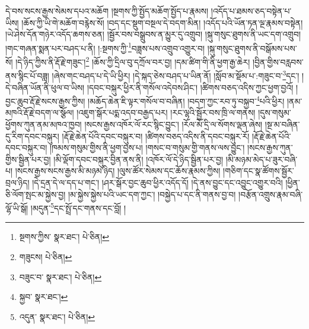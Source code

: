 དེ་བས་སངས་རྒྱས་སེམས་དཔའ་མཆོག །སྔགས་ཀྱི་སྤྱོད་མཆོག་སྤྱོད་པ་རྣམས། །འདོད་པ་ཐམས་ཅད་བསྟེན་པ་ཡིས། །ཆོས་ཀྱི་ཡི་གེ་མཆོག་བརྙེས་སོ། །བད་དང་སྡུག་བསྔལ་དེ་བདག་མིན། །འདོད་པའི་ཡོན་ཏན་ལྔ་རྣམས་བསྟེན། །ཡེ་ཤེས་དོན་གཉེར་འདོད་ཆགས་ཅན། །སྦྱོར་བས་བསྒྲུབས་ན་མྱུར་དུ་འགྲུབ། །སྐུ་གསུང་ཐུགས་ནི་ཡང་དག་འགྲུབ། །གང་གཞན་སྨན་པར་བཤད་པ་ནི། །:སྔགས་ཀྱི་\footnote{སྔགས་ཀྱིས་  སྣར་ཐང་།  པེ་ཅིན། }བཟླས་པས་འགྲུབ་འགྱུར་བ། །སྐུ་གསུང་ཐུགས་ནི་བསྒོམས་པས་སོ། །དེ་ཉིད་ཀྱིས་ནི་རྡོ་རྗེ་གཟུང་།\footnote{གཟུངས།  པེ་ཅིན། } །ཆོས་ཀྱི་དྲིལ་བུ་དཀྲོལ་བར་བྱ། །དམ་ཚིག་གི་ནི་ཕྱག་རྒྱ་ཆེར། །བྱིན་གྱིས་བརླབས་ནས་སྙིང་པོ་བཟླ། །ཞེས་གང་བཤད་པ་དེ་ཡི་ཕྱིར། །དེ་སྐད་ཅེས་བཤད་པ་ཡིན་ནོ། །སློབ་མ་སྡོམ་པ་:གཟུང་བ་\footnote{བཟུང་བ་  སྣར་ཐང་།  པེ་ཅིན། }དང་། །དེ་བཞིན་ཡོན་ནི་ཕུལ་བ་ཡིས། །དབང་བསྐུར་ཕྱིར་ནི་གསོལ་འདེབས་ཤིང་། །ཚིགས་བཅད་འདིས་ཀྱང་ཕྱག་བྱའོ། །བྱང་ཆུབ་རྡོ་རྗེ་སངས་རྒྱས་ཀྱིས། །མཆོད་ཆེན་ཇི་ལྟར་གསོལ་བ་བཞིན། །བདག་ཀྱང་རབ་ཏུ་བསྐྱབ་\footnote{སྐྱབ་  སྣར་ཐང་། }པའི་ཕྱིར། །ནམ་མཁའི་རྡོ་རྗེ་བདག་ལ་སྩོལ། །འཇུག་སྒོར་པདྨ་འདབ་བརྒྱད་པར། །རང་ལྷའི་སྦྱོར་བས་ཁྲི་ལ་གནས། །དུས་གསུམ་ཕྱོགས་ཀུན་ནམ་མཁའ་ཁྱབ། །སངས་རྒྱས་འཁོར་ལོ་རང་སྙིང་བྱུང་། །རོལ་མོ་དྲི་ལ་སོགས་ལྡན་ཞེས། །སྔ་མ་བཞིན་དུ་རིག་དབང་བསྐུར། །རྡོ་རྗེ་ཆེན་པོའི་དབང་བསྐུར་བ། །ཚིགས་བཅད་འདིས་ནི་དབང་བསྐུར་རོ། །རྡོ་རྗེ་ཆེན་པོའི་དབང་བསྐུར་བ། །ཁམས་གསུམ་གྱིས་ནི་ཕྱག་བྱས་པ། །གསང་བ་གསུམ་གྱི་གནས་ལས་བྱུང་། །སངས་རྒྱས་ཀུན་གྱིས་སྦྱིན་པར་བྱ། །མི་ལྡོག་དབང་བསྐུར་བྱིན་ནས་ནི། །འཁོར་ལོ་དེ་ཉིད་སྦྱིན་པར་བྱ། །མི་མཉམ་མེད་པ་ཟུར་བཞི་པ། །སངས་རྒྱས་སངས་རྒྱས་མི་མཉམ་ཉིད། །ལུས་ཚོར་སེམས་དང་ཆོས་རྣམས་ཀྱིས། །གཅིག་དང་སྣ་ཚོགས་སྦྱོར་བྲལ་ཉིད། །དེ་དྲན་དེ་ལ་དད་པ་གང་། །ཤར་སྒོར་བྱང་ཆུབ་ཕྱིར་འདོད་དོ། །དེ་ནས་བྱུང་དང་འབྱུང་འགྱུར་བའི། །ཕྱིན་ཅི་ལོག་སྤང་མ་སྐྱེས་བྱ། །མ་སྐྱེས་སྐྱེས་པའི་ཡང་དག་ཀྱང་། །བསྐྱེད་པ་དང་ནི་གནས་བྱ་བ། །བརྩོན་འགྲུས་རྣམ་བཞི་ལྷོ་ཡི་སྒོ། །མདུན་\footnote{འདུན་  སྣར་ཐང་།  པེ་ཅིན། }དང་སྤྲོ་དང་གནས་དང་བློ། །
